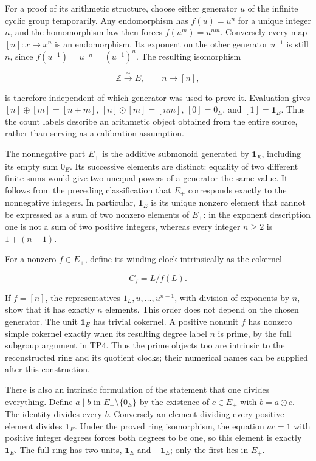 \documentclass[
]{article}
\begin{document}
For a proof of its arithmetic structure, choose either generator \(u\)
of the infinite cyclic group temporarily. Any endomorphism has
\(f(u)=u^n\) for a unique integer \(n\), and the homomorphism law then
forces \(f(u^m)=u^{nm}\). Conversely every map \([n]:x\mapsto x^n\) is
an endomorphism. Its exponent on the other generator \(u^{-1}\) is still
\(n\), since \(f(u^{-1})=u^{-n}=(u^{-1})^n\). The resulting isomorphism

\[
\mathbb Z\xrightarrow{\sim}E,\qquad n\longmapsto[n],
\]

is therefore independent of which generator was used to prove it.
Evaluation gives \([n]\oplus[m]=[n+m]\), \([n]\odot[m]=[nm]\),
\([0]=0_E\), and \([1]=\mathbf1_E\). Thus the count labels describe an
arithmetic object obtained from the entire source, rather than serving
as a calibration assumption.

The nonnegative part \(E_+\) is the additive submonoid generated by
\(\mathbf1_E\), including its empty sum \(0_E\). Its successive elements
are distinct: equality of two different finite sums would give two
unequal powers of a generator the same value. It follows from the
preceding classification that \(E_+\) corresponds exactly to the
nonnegative integers. In particular, \(\mathbf1_E\) is its unique
nonzero element that cannot be expressed as a sum of two nonzero
elements of \(E_+\): in the exponent description one is not a sum of two
positive integers, whereas every integer \(n\ge2\) is \(1+(n-1)\).

For a nonzero \(f\in E_+\), define its winding clock intrinsically as
the cokernel

\[
C_f=L/f(L).
\]

If \(f=[n]\), the representatives \(1_L,u,\ldots,u^{n-1}\), with
division of exponents by \(n\), show that it has exactly \(n\) elements.
This order does not depend on the chosen generator. The unit
\(\mathbf1_E\) has trivial cokernel. A positive nonunit \(f\) has
nonzero simple cokernel exactly when its resulting degree label \(n\) is
prime, by the full subgroup argument in TP4. Thus the prime objects too
are intrinsic to the reconstructed ring and its quotient clocks; their
numerical names can be supplied after this construction.

There is also an intrinsic formulation of the statement that one divides
everything. Define \(a\mid b\) in \(E_+\setminus\{0_E\}\) by the
existence of \(c\in E_+\) with \(b=a\odot c\). The identity divides
every \(b\). Conversely an element dividing every positive element
divides \(\mathbf1_E\). Under the proved ring isomorphism, the equation
\(ac=1\) with positive integer degrees forces both degrees to be one, so
this element is exactly \(\mathbf1_E\). The full ring has two units,
\(\mathbf1_E\) and \(-\mathbf1_E\); only the first lies in \(E_+\).
\end{document}
